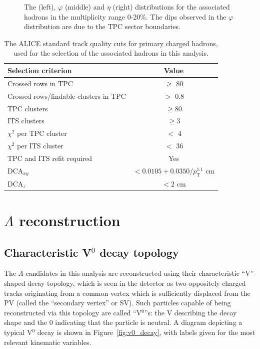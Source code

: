 \begin{figure}[t!]
\begin{minipage}{0.32\textwidth}
	\end{minipage}
	\caption{The \pt (left), $\varphi$ (middle) and $\eta$ (right) distributions for the associated hadrons in the multiplicity range 0-20\%. The dips observed in the $\varphi$ distribution are due to the TPC sector boundaries.}
	\label{fig:assoc_plots}
\end{figure}

\begin{table}[h]
	\centering
	\caption{The ALICE standard track quality cuts for primary charged hadrons, used for the selection of the associated hadrons in this analysis.}
	\label{tab:primary_track_cuts}
	\begin{tabular}{ l  c }
		\hline
		Selection criterion & Value \\
		\hline
		Crossed rows in TPC & $\geq$ 80 \\
		Crossed rows/findable clusters in TPC & $>$ 0.8 \\
		TPC clusters & $\geq 80$ \\
		ITS clusters & $\geq 3$ \\
		$\chi^{2}$ per TPC cluster  & $<$ 4 \\
		$\chi^{2}$ per ITS cluster  & $<$ 36 \\
		TPC and ITS refit required & Yes \\
		DCA$_{xy}$ & $< 0.0105 + 0.0350/p_{\text{T}}^{1.1}$ cm \\
		DCA$_{z}$ & $< 2$ cm \\
		\hline
	\end{tabular}
\end{table}

\section{$\Lambda$ reconstruction}
\label{sec:lambda_reconstruction}

\subsection{Characteristic V$^0$ decay topology}
\label{sec:v0_decay}

The $\Lambda$ candidates in this analysis are reconstructed using their characteristic ``V''-shaped decay topology, which is seen in the detector as two oppositely charged tracks originating from a common vertex which is sufficiently displaced from the PV (called the ``secondary vertex'' or SV). Such particles capable of being reconstructed via this topology are called ``V$^0$''s: the V describing the decay shape and the 0 indicating that the particle is neutral. A diagram depicting a typical V$^0$ decay is shown in Figure~\ref{fig:v0_decay}, with labels given for the most relevant kinematic variables.

